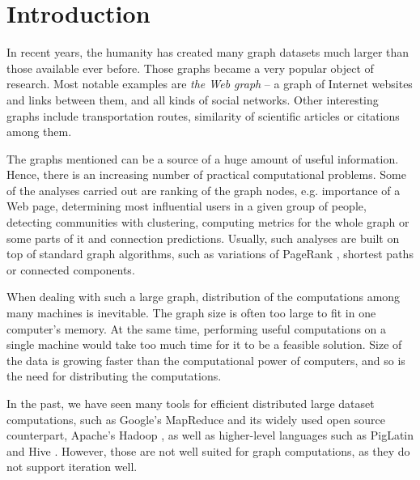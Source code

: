 
\chapter*{Introduction}
In recent years, the humanity has created many graph datasets much larger than those available ever before.
Those graphs became a very popular object of research. Most notable examples are \emph{the Web graph} -- a graph of Internet websites and links between them, and all kinds of social networks. Other interesting graphs include transportation routes, similarity of scientific articles or citations among them.


The graphs mentioned can be a source of a huge amount of useful information. Hence, there is an increasing number of practical computational problems.
Some of the analyses carried out are ranking of the graph nodes, e.g. importance of a Web page, determining most influential users in a given group of people, detecting communities with clustering, computing metrics for the whole graph or some parts of it and connection predictions.
Usually, such analyses are built on top of standard graph algorithms, such as variations of PageRank \cite{pagerank}, shortest paths or connected components.

When dealing with such a large graph, distribution of the computations among many machines is inevitable. The graph size is often too large to fit in one computer's memory. At the same time, performing useful computations on a single machine would take too much time for it to be a feasible solution. Size of the data is growing faster than the computational power of computers, and so is the need for distributing the computations.

In the past, we have seen many tools for efficient distributed large dataset computations, such as Google's MapReduce \cite{mapreduce} and its widely used open source counterpart, Apache's Hadoop \cite{hadoop}, as well as higher-level languages such as PigLatin \cite{piglatin} and Hive \cite{hive}. However, those are not well suited for graph computations, as they do not support iteration well.

